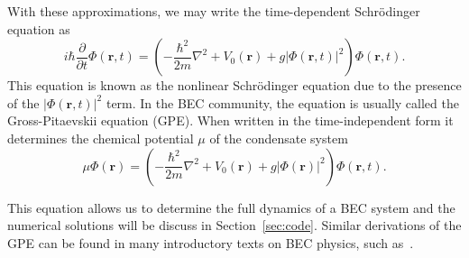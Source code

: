 With these approximations, we may write the time-dependent Schr\"odinger equation as
\begin{equation}
    i\hbar \frac{\partial}{\partial t}\Phi(\mathbf{r},t) = \left( - \frac{\hbar^2}{2m} \nabla^2 + V_0(\mathbf{r}) + g |\Phi(\mathbf{r},t)|^2\right)\Phi(\mathbf{r},t).
\end{equation}
This equation is known as the nonlinear Schr\"odinger equation due to the presence of the $|\Phi(\mathbf{r},t)|^2$ term.
In the BEC community, the equation is usually called the Gross-Pitaevskii equation (GPE).
When written in the time-independent form it determines the chemical potential $\mu$ of the condensate system~\cite{Gross1961, Pitaevskii1961}
\begin{equation}
    \mu\Phi(\mathbf{r}) = \left( - \frac{\hbar^2}{2m} \nabla^2 + V_0(\mathbf{r}) + g |\Phi(\mathbf{r})|^2\right)\Phi(\mathbf{r},t).
    \label{eqn:GP}
\end{equation}

This equation allows us to determine the full dynamics of a BEC system and the numerical solutions will be discuss in Section~\ref{sec:code}. Similar derivations of the GPE can be found in many introductory texts on BEC physics, such as~\cite{Fetter2003,  Pethick2002, Fetter2009}.

